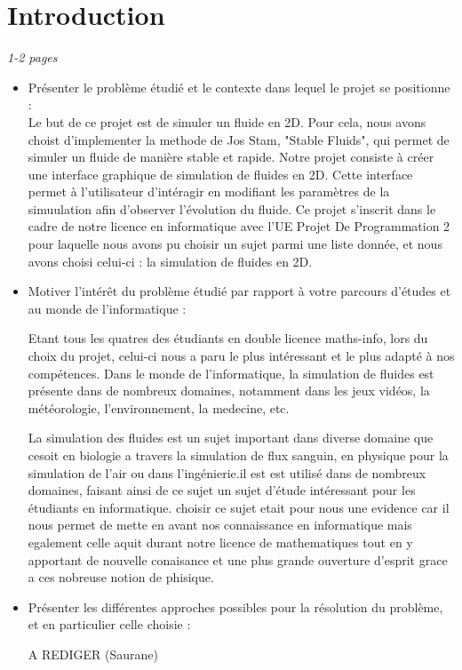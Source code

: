 \documentclass[a4paper]{article}
\begin{document}
\section*{Introduction} %
\emph{1-2 pages}
\begin{itemize}%

\item Présenter le problème étudié et le contexte dans lequel le projet se positionne : \\
Le but de ce projet est de simuler un fluide en 2D. Pour cela, nous avons choist d'implementer la methode
de Jos Stam, "Stable Fluids", qui permet de simuler un fluide de manière stable et rapide.
Notre projet consiste à créer une interface graphique de simulation de fluides en 2D. Cette
interface permet à l'utilisateur d'intéragir en modifiant les paramètres de la simuulation
afin d'observer l'évolution du fluide. Ce projet s'inscrit dans le cadre de notre licence en 
informatique avec l'UE Projet De Programmation 2 pour laquelle nous avons pu choisir un sujet 
parmi une liste donnée, et nous avons choisi celui-ci : la simulation de fluides en 2D.

\item Motiver l'intérêt du problème étudié par rapport à votre parcours d'études et au monde 
de l'informatique : 

Etant tous les quatres des étudiants en double licence maths-info, lors du 
choix du projet, celui-ci nous a paru le plus intéressant et le plus adapté à nos compétences.
Dans le monde de l'informatique, la simulation de fluides est présente dans de nombreux domaines,
notamment dans les jeux vidéos, la météorologie, l'environnement, la medecine, etc. 

La simulation des fluides est un sujet important dans diverse domaine que cesoit
en biologie a travers la simulation de flux sanguin, en physique pour la simulation de l'air 
ou dans l'ingénierie.il est est utilisé dans de nombreux domaines, faisant ainsi de ce sujet
un sujet d'étude intéressant pour les étudiants en informatique.
choisir ce sujet etait pour nous une evidence car il nous permet de mette 
en avant nos connaissance en informatique mais egalement celle aquit durant 
notre licence de mathematiques tout en y apportant de nouvelle conaisance
et une plus grande ouverture d'esprit grace a ces nobreuse notion de phisique.

\item	Présenter les différentes approches possibles pour la résolution du problème, et en 
particulier celle choisie : 
{\color {red} A REDIGER (Saurane)

}
\end{itemize}
\end{document}
